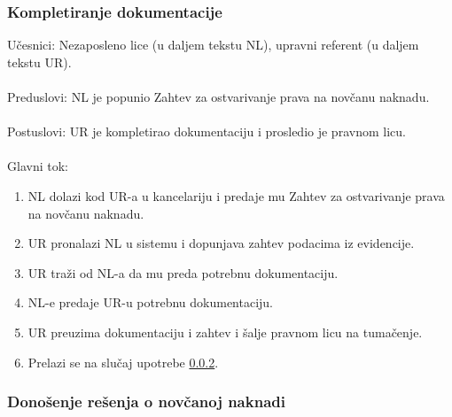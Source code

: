 \subsubsection{Kompletiranje dokumentacije}
\label{su: kompletiranje dokumentacije}

\noindent Učesnici: Nezaposleno lice (u daljem tekstu NL), upravni referent (u daljem tekstu UR).
\\
\\ Preduslovi: NL je popunio Zahtev za ostvarivanje prava na novčanu naknadu.
\\
\\ Postuslovi: UR je kompletirao dokumentaciju i prosledio je pravnom licu.
\\
\\ Glavni tok:
\begin{enumerate}
\item NL dolazi kod UR-a u kancelariju i predaje mu Zahtev za ostvarivanje prava na novčanu naknadu.
\item UR pronalazi NL u sistemu i dopunjava zahtev podacima iz evidencije.
\item UR traži od NL-a da mu preda potrebnu dokumentaciju.
\item NL-e predaje UR-u potrebnu dokumentaciju.
\item UR preuzima dokumentaciju i zahtev i šalje pravnom licu na tumačenje.
\item Prelazi se na slu\v caj upotrebe \ref{su: resenje}.
\end{enumerate}

\subsubsection{Donošenje rešenja o novčanoj naknadi}
\label{su: resenje}

